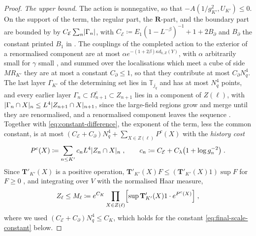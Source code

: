 \documentclass[11pt]{preprint}
\DeclarePairedDelimiter{\abs}{\lvert}{\rvert}
\numberwithin{equation}{section}
\theoremstyle{definition}
\theoremstyle{remark}
\theoremstyle{plain}
\begin{document}
\begin{proof}
\emph{The upper bound.} The action is nonnegative, so that $-A(1/g_{K'}^2, U_{K'}) \leq 0$. On the support of the term, the regular part, the $\mathbf R$-part, and the boundary part are bounded by \cite[(2.45), (2.46), (2.48), pp.~263--264]{BalabanCRE} by $C_{\mathcal E}\sum_n\abs{\Gamma_n}$, with $C_{\mathcal E} \coloneqq E_1(1 - L^{-\beta})^{-1} + 1 + 2B_\partial$ and $B_\partial$ the constant printed $B_1$ in \cite[(2.47)]{BalabanCRE}. The couplings of the completed action to the exterior of a renormalised component are at most $\alpha e^{-(1+2\beta)\kappa d_{k,Z}(Y)}$, with $\alpha$ arbitrarily small for $\gamma$ small \cite[(1.68), p.~377]{BalabanLFR2}, and summed over the localisations which meet a cube of side $MR_{K'}$ they are at most a constant $C_\partial \leq 1$, so that they contribute at most $C_\partial N_q^4$. The last layer $\Gamma_{K'}$ of the determining set lies in $\mathbb T_{j_q}$ and has at most $N_q^4$ points, and every earlier layer $\Gamma_n \subset \Omega_{n+1}^c \subset Z_{n+1}$ lies in a component of $Z(\ell)$, with $\abs{\Gamma_n \cap X}_n \leq L^4\abs{Z_{n+1} \cap X}_{n+1}$, since the large-field regions grow and merge until they are renormalised, and a renormalised component leaves the sequence \cite[(0.3), p.~176]{BalabanLFR1}. Together with \eqref{eq:constant-difference}, the exponent of the term, less the common constant, is at most $(C_{\mathcal E} + C_\partial)N_q^4 + \sum_{X \in Z(\ell)}P^c(X)$ with the \emph{history cost}
\begin{equation}\label{eq:history-cost}
    P^c(X) \coloneqq \sum_{n \leq K'}c_nL^4\abs{Z_n \cap X}_n\;,
    \qquad
    c_n \coloneqq C_{\mathcal E} + C_\lambda\bigl(1 + \log g_n^{-2}\bigr)\;.
\end{equation}
Since $\mathbf T'_{K'}(X)$ is a positive operation, $\mathbf T'_{K'}(X)F \leq (\mathbf T'_{K'}(X)1)\sup F$ for $F \geq 0$ \cite[(1.73), p.~380]{BalabanLFR2}, and integrating over $V$ with the normalised Haar measure,
\begin{equation}\label{eq:term-majorant}
    Z_\ell \leq M_\ell \coloneqq e^{C_K}\prod_{X \in Z(\ell)}\Bigl[\sup\mathbf T'_{K'}(X)1\cdot e^{P^c(X)}\Bigr]\;,
\end{equation}
where we used $(C_{\mathcal E} + C_\partial)N_q^4 \leq C_K$, which holds for the constant \eqref{eq:final-scale-constant} below.


\end{proof}
\end{document}
